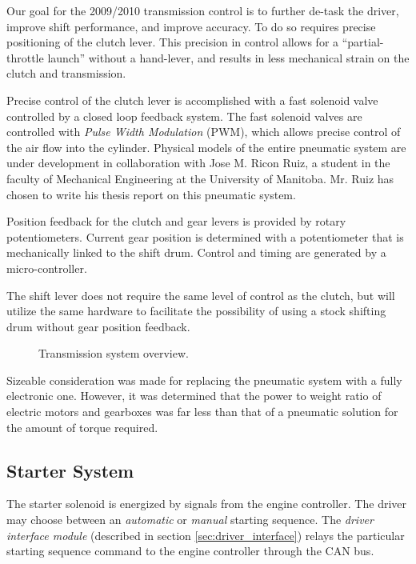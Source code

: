 Our goal for the 2009/2010 transmission control is to further de-task the driver, improve shift performance, and improve accuracy. To do so requires precise positioning of the clutch lever. This precision in control allows for a {}``partial-throttle launch'' without a hand-lever, and results in less mechanical strain on the clutch and transmission. 


Precise control of the clutch lever is accomplished with a fast solenoid valve controlled by a closed loop feedback system. The fast solenoid valves are controlled with \emph{Pulse Width Modulation} (PWM), which allows precise control of the air flow into the cylinder. Physical models of the entire pneumatic system are under development in collaboration with Jose M. Ricon Ruiz, a student in the faculty of Mechanical Engineering at the University of Manitoba. Mr. Ruiz has chosen to write his thesis report on this pneumatic system. 

Position feedback for the clutch and gear levers is provided by rotary potentiometers. Current gear position is determined with a potentiometer that is mechanically linked to the shift drum. Control and timing are generated by a micro-controller.

The shift lever does not require the same level of control as the clutch, but will utilize the same hardware to facilitate the possibility of using a stock shifting drum without gear position feedback.

\begin{figure}[H]
	\centering
		
	\caption{Transmission system overview.}
	\label{fig:transmission_system_overview}
\end{figure}

Sizeable consideration was made for replacing the pneumatic system with a fully electronic one. However, it was determined that the power to weight ratio of electric motors and gearboxes was far less than that of a pneumatic solution for the amount of torque required.

\subsection{Starter System}

The starter solenoid is energized by signals from the engine controller. The driver may choose between an \emph{automatic} or \emph{manual} starting sequence. The \emph{driver interface module} (described in section \ref{sec:driver_interface}) relays the particular starting sequence command to the engine controller through the CAN bus.

